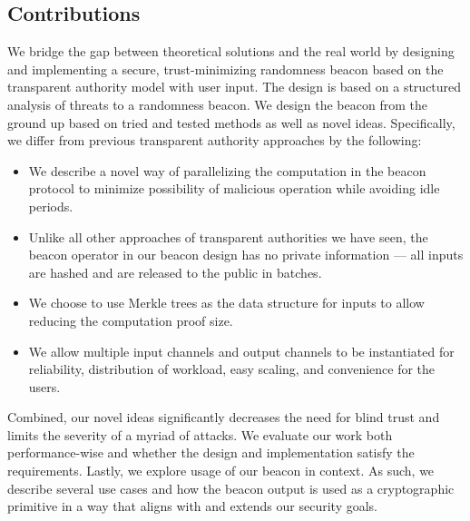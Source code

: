 \subsection{Contributions}
We bridge the gap between theoretical solutions and the real world by designing and implementing a secure, trust-minimizing randomness beacon based on the transparent authority model with user input.
The design is based on a structured analysis of threats to a randomness beacon.
We design the beacon from the ground up based on tried and tested methods as well as novel ideas.
Specifically, we differ from previous transparent authority approaches by the following:
\begin{itemize}
    \item We describe a novel way of parallelizing the computation in the beacon protocol to minimize possibility of malicious operation while avoiding idle periods.
    \item Unlike all other approaches of transparent authorities we have seen, the beacon operator in our beacon design has no private information --- all inputs are hashed and are released to the public in batches.
    \item We choose to use Merkle trees as the data structure for inputs to allow reducing the computation proof size.
    \item We allow multiple input channels and output channels to be instantiated for reliability, distribution of workload, easy scaling, and convenience for the users.
\end{itemize}
Combined, our novel ideas significantly decreases the need for blind trust and limits the severity of a myriad of attacks.
We evaluate our work both performance-wise and whether the design and implementation satisfy the requirements.
Lastly, we explore usage of our beacon in context.
As such, we describe several use cases and how the beacon output is used as a cryptographic primitive in a way that aligns with and extends our security goals.

